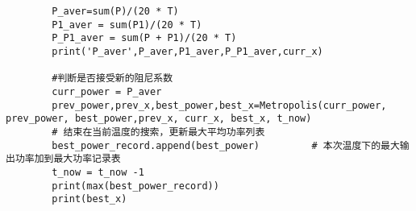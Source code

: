 \documentclass[a4paper,12pt]{article}
\begin{document}
\begin{lstlisting}
		P_aver=sum(P)/(20 * T)
		P1_aver = sum(P1)/(20 * T)
		P_P1_aver = sum(P + P1)/(20 * T)
		print('P_aver',P_aver,P1_aver,P_P1_aver,curr_x)
		
		#判断是否接受新的阻尼系数
		curr_power = P_aver
		prev_power,prev_x,best_power,best_x=Metropolis(curr_power, prev_power, best_power,prev_x, curr_x, best_x, t_now)
		# 结束在当前温度的搜索，更新最大平均功率列表
		best_power_record.append(best_power)         # 本次温度下的最大输出功率加到最大功率记录表
		t_now = t_now -1
		print(max(best_power_record))
		print(best_x)
		
		
	\end{lstlisting}
\end{document}
